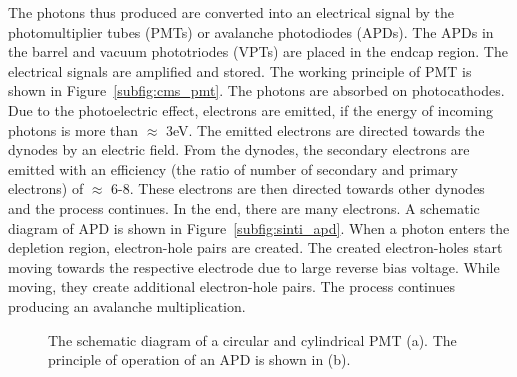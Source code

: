 The photons thus produced are converted into an electrical signal by the 
photomultiplier tubes (PMTs) or avalanche photodiodes (APDs). The APDs in the
barrel and vacuum phototriodes (VPTs) are placed in the endcap region. The 
electrical signals are amplified and stored. The working principle of PMT is shown 
in Figure~\ref{subfig:cms_pmt}. The photons 
are absorbed on photocathodes. Due to the photoelectric effect, electrons are emitted, 
if the energy of incoming photons is more than $\approx$ 3\unit{eV}. The emitted electrons 
are directed towards the dynodes by an electric field. From the dynodes, the
secondary electrons are emitted with an efficiency (the ratio of number of secondary 
and primary electrons) of $\approx$ 6-8. These electrons are then directed towards 
other dynodes and the process continues. In the end, there are many electrons. 
A schematic diagram of APD is shown in Figure~\ref{subfig:sinti_apd}. When a photon enters 
the depletion region, electron-hole pairs are created. The created electron-holes start moving towards
the respective electrode due to large reverse bias voltage. While moving, they
create additional electron-hole pairs. The process continues producing an avalanche
multiplication.
\begin{figure}
  \centering
	 \hfil
	 \caption{The schematic diagram of a circular and cylindrical PMT (a). 
	 The principle of operation of an APD is shown in (b).}
	 \label{fig:cms_pmt_apd}
\end{figure}

